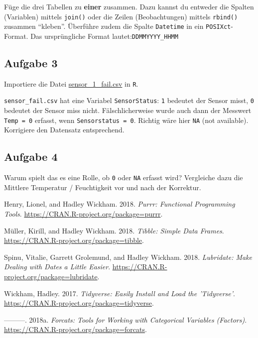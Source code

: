 \documentclass[]{book}
\begin{document}
Füge die drei Tabellen zu \textbf{einer} zusammen. Dazu kannst du entweder die Spalten (Variablen) mittels \texttt{join()} oder die Zeilen (Beobachtungen) mittels \texttt{rbind()} zusammen ``kleben''. Überführe zudem die Spalte \texttt{Datetime} in ein \texttt{POSIXct}-Format. Das ursprüngliche Format lautet:\texttt{DDMMYYYY\_HHMM}

\hypertarget{aufgabe-3-3}{%
\subsection{Aufgabe 3}\label{aufgabe-3-3}}

Importiere die Datei \href{10_PrePro2/data/sensor_fail.csv}{sensor\_1\_fail.csv} in \texttt{R}.

\texttt{sensor\_fail.csv} hat eine Variabel \texttt{SensorStatus}: \texttt{1} bedeutet der Sensor misst, \texttt{0} bedeutet der Sensor miss nicht. Fälschlicherweise wurde auch dann der Messwert \texttt{Temp\ =\ 0} erfasst, wenn \texttt{Sensorstatus\ =\ 0}. Richtig wäre hier \texttt{NA} (not available). Korrigiere den Datensatz entsprechend.

\hypertarget{aufgabe-4-2}{%
\subsection{Aufgabe 4}\label{aufgabe-4-2}}

Warum spielt das es eine Rolle, ob \texttt{0} oder \texttt{NA} erfasst wird? Vergleiche dazu die Mittlere Temperatur / Feuchtigkeit vor und nach der Korrektur.

\hypertarget{refs}{}
\leavevmode\hypertarget{ref-R-purrr}{}%
Henry, Lionel, and Hadley Wickham. 2018. \emph{Purrr: Functional Programming Tools}. \url{https://CRAN.R-project.org/package=purrr}.

\leavevmode\hypertarget{ref-R-tibble}{}%
Müller, Kirill, and Hadley Wickham. 2018. \emph{Tibble: Simple Data Frames}. \url{https://CRAN.R-project.org/package=tibble}.

\leavevmode\hypertarget{ref-R-lubridate}{}%
Spinu, Vitalie, Garrett Grolemund, and Hadley Wickham. 2018. \emph{Lubridate: Make Dealing with Dates a Little Easier}. \url{https://CRAN.R-project.org/package=lubridate}.

\leavevmode\hypertarget{ref-R-tidyverse}{}%
Wickham, Hadley. 2017. \emph{Tidyverse: Easily Install and Load the 'Tidyverse'}. \url{https://CRAN.R-project.org/package=tidyverse}.

\leavevmode\hypertarget{ref-R-forcats}{}%
---------. 2018a. \emph{Forcats: Tools for Working with Categorical Variables (Factors)}. \url{https://CRAN.R-project.org/package=forcats}.
\end{document}
